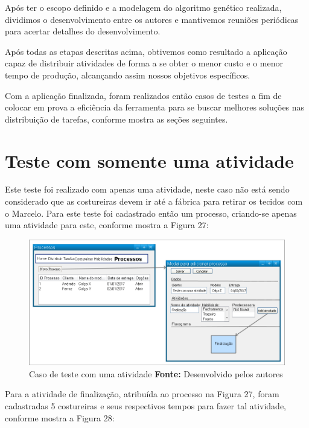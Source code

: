 \par Após ter o escopo definido e a modelagem do algoritmo genético realizada, dividimos o desenvolvimento entre os autores
e mantivemos reuniões periódicas para acertar detalhes do desenvolvimento.

\par Após todas as etapas descritas acima, obtivemos como resultado a aplicação capaz de distribuir atividades de forma a se obter o 
menor custo e o menor tempo de produção, alcançando assim nossos objetivos específicos. 

\par Com a aplicação finalizada, foram realizados então casos de testes a fim de colocar em prova a eficiência da ferramenta para se 
buscar melhores soluções nas distribuição de tarefas, conforme mostra as seções
seguintes.


\section{Teste com somente uma atividade}
\par Este teste foi realizado com apenas uma atividade, neste caso não está sendo considerado que as costureiras devem ir 
até a fábrica para retirar os tecidos com o Marcelo. Para este teste foi cadastrado então um processo, criando-se apenas uma atividade para 
este, conforme mostra a Figura 27:

\begin{figure}[h!]
	\centerline{\includegraphics[scale=0.4]{./imagens/test_case_1.png}}
	\caption[Caso de teste com uma atividade]
	{Caso de teste com uma atividade \textbf{Fonte:} Desenvolvido pelos autores}
	\label{fig:exemplo1}
\end{figure}

\par Para a atividade de finalização, atribuída ao processo na Figura 27, foram
cadastradas 5 costureiras e seus respectivos tempos para fazer tal atividade,
conforme mostra a Figura 28:

